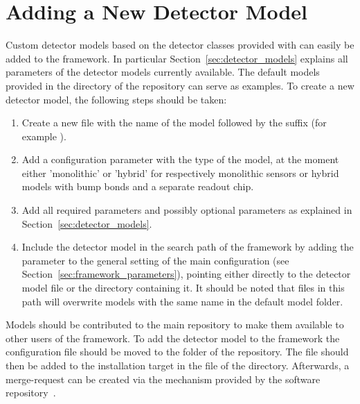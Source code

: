 \section{Adding a New Detector Model}
\label{sec:adding_detector_model}
Custom detector models based on the detector classes provided with \apsq can easily be added to the framework.
In particular Section~\ref{sec:detector_models} explains all parameters of the detector models currently available.
The default models provided in the  directory of the repository can serve as examples.
To create a new detector model, the following steps should be taken:
\begin{enumerate}
\item Create a new file with the name of the model followed by the  suffix (for example ).
\item Add a configuration parameter  with the type of the model, at the moment either 'monolithic' or 'hybrid' for respectively monolithic sensors or hybrid models with bump bonds and a separate readout chip.
\item Add all required parameters and possibly optional parameters as explained in Section~\ref{sec:detector_models}.
\item Include the detector model in the search path of the framework by adding the  parameter to the general setting of the main configuration (see Section~\ref{sec:framework_parameters}), pointing either directly to the detector model file or the directory containing it. It should be noted that files in this path will overwrite models with the same name in the default model folder.
\end{enumerate}

Models should be contributed to the main repository to make them available to other users of the framework.
To add the detector model to the framework the configuration file should be moved to the  folder of the repository.
The file should then be added to the installation target in the  file of the  directory.
Afterwards, a merge-request can be created via the mechanism provided by the software repository~\cite{ap2-repo}.
